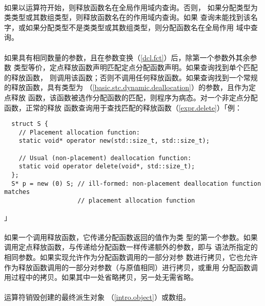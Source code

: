 \paragraph{}
如果以\tm{::}运算符开始，则释放函数名在全局作用域内查询。否则，
如果分配类型为类类型或其数组类型，则释放函数名在的作用域内查询。如果
查询未能找到该名字，或如果分配类型不是类类型或其数组类型，则分配函数名在全局作用
域中查询。

\paragraph{}
如果具有相同数量的参数，且在参数变换（\ref{dcl.fct}）后，除第一个参数外其余参数
类型等价，定点释放函数声明匹配定点分配函数声明。如果查询找到单个匹配的释放函数，
则调用该函数；否则不调用任何释放函数。如果查询找到一个常规的释放函数，具有类型为
（\ref{basic.stc.dynamic.deallocation}）的参数，且作为定点释放
函数，该函数被选作分配函数的匹配，则程序为病态。对一个非定点分配函数，正常的释放
函数查询用于查找匹配的释放函数（\ref{expr.delete}）「例：
\begin{lstlisting}
  struct S {
    // Placement allocation function:
    static void* operator new(std::size_t, std::size_t);

    // Usual (non-placement) deallocation function:
    static void operator delete(void*, std::size_t);
  };
  S* p = new (0) S; // ill-formed: non-placement deallocation function matches
                    // placement allocation function
\end{lstlisting}」

\paragraph{}
如果一个调用释放函数，它传递分配函数返回的值作为类
型的第一个参数。如果调用定点释放函数，与传递给分配函数一样传递额外的参数，即与
语法所指定的相同参数。如果实现允许作为分配函数调用的一部分对参
数进行拷贝，它也允许作为释放函数调用的一部分对参数（与原值相同）进行拷贝，或重用
分配函数调用过程中的拷贝。如果其中一处省略拷贝，另一处无需省略。

\paragraph{}
运算符销毁创建的最终派生对象
（\ref{intro.object}）或数组。


